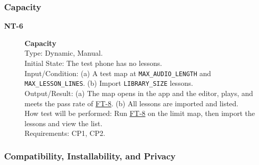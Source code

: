 \documentclass[12pt, titlepage]{article}
\newcommand{\tid}[1]{\hypertarget{test:#1}{\textbf{#1}}}
\newcommand{\tref}[1]{\hyperlink{test:#1}{#1}}
\newcommand{\cn}[1]{\texttt{#1}}
\begin{document}
\subsubsection{Capacity} \label{SecCapacityTests}

\begin{description}

\item[\tid{NT-6}] \textbf{Capacity}\\
Type: Dynamic, Manual.\\
Initial State: The test phone has no lessons.\\
Input/Condition: (a) A test map at \cn{MAX\_AUDIO\_LENGTH} and
\cn{MAX\_LESSON\_LINES}. (b) Import \cn{LIBRARY\_SIZE} lessons.\\
Output/Result: (a) The map opens in the app and the editor, plays, and meets the
pass rate of \tref{FT-8}. (b) All lessons are imported and listed.\\
How test will be performed: Run \tref{FT-8} on the limit map, then import the
lessons and view the list.\\
Requirements: CP1, CP2.

\end{description}

\subsubsection{Compatibility, Installability, and Privacy} \label{SecCompatTests}
\end{document}
